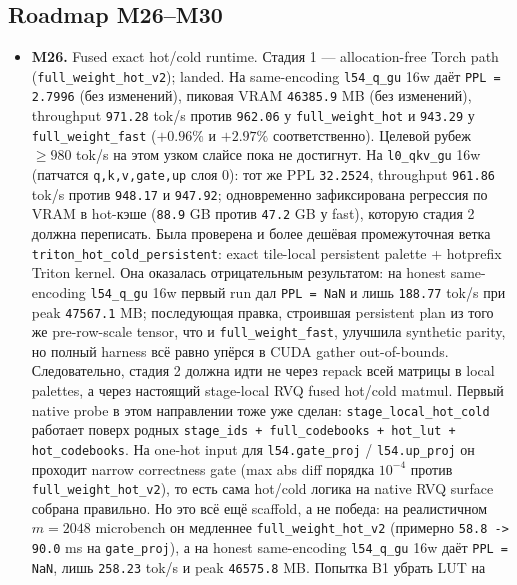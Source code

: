 \subsection{Roadmap M26--M30}

\begin{itemize}[leftmargin=1.5em]
\item \textbf{M26.} Fused exact hot/cold runtime. Стадия 1 --- allocation-free
Torch path (\texttt{full\_weight\_hot\_v2}); landed. На same-encoding
\texttt{l54\_q\_gu} 16w даёт \texttt{PPL = 2.7996} (без изменений), пиковая
VRAM \texttt{46385.9} MB (без изменений), throughput \texttt{971.28} tok/s
против \texttt{962.06} у \texttt{full\_weight\_hot} и \texttt{943.29} у
\texttt{full\_weight\_fast} ($+0.96\%$ и $+2.97\%$ соответственно). Целевой
рубеж $\ge 980$ tok/s на этом узком слайсе пока не достигнут. На
\texttt{l0\_qkv\_gu} 16w (патчатся \texttt{q,k,v,gate,up} слоя 0): тот же
PPL \texttt{32.2524}, throughput \texttt{961.86} tok/s против \texttt{948.17}
и \texttt{947.92}; одновременно зафиксирована регрессия по VRAM в hot-кэше
(\texttt{88.9} GB против \texttt{47.2} GB у fast), которую стадия 2 должна
переписать. Была проверена и более дешёвая промежуточная ветка
\texttt{triton\_hot\_cold\_persistent}: exact tile-local persistent palette +
hotprefix Triton kernel. Она оказалась отрицательным результатом: на honest
same-encoding \texttt{l54\_q\_gu} 16w первый run дал \texttt{PPL = NaN} и лишь
\texttt{188.77} tok/s при peak \texttt{47567.1} MB; последующая правка,
строившая persistent plan из того же pre-row-scale tensor, что и
\texttt{full\_weight\_fast}, улучшила synthetic parity, но полный harness всё
равно упёрся в CUDA gather out-of-bounds. Следовательно, стадия 2 должна идти
не через repack всей матрицы в local palettes, а через настоящий stage-local
RVQ fused hot/cold matmul. Первый native probe в этом направлении тоже уже
сделан: \texttt{stage\_local\_hot\_cold} работает поверх родных
\texttt{stage\_ids + full\_codebooks + hot\_lut + hot\_codebooks}. На one-hot
input для \texttt{l54.gate\_proj} / \texttt{l54.up\_proj} он проходит narrow
correctness gate (max abs diff порядка $10^{-4}$ против
\texttt{full\_weight\_hot\_v2}), то есть сама hot/cold логика на native RVQ
surface собрана правильно. Но это всё ещё scaffold, а не победа: на
реалистичном $m = 2048$ microbench он медленнее \texttt{full\_weight\_hot\_v2}
(примерно \texttt{58.8 -> 90.0} ms на \texttt{gate\_proj}), а на honest
same-encoding \texttt{l54\_q\_gu} 16w даёт \texttt{PPL = NaN}, лишь
\texttt{258.23} tok/s и peak \texttt{46575.8} MB. Попытка B1 убрать LUT на

\end{itemize}
